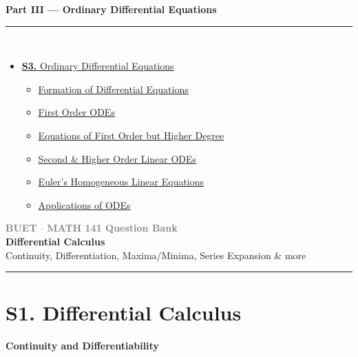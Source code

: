 \documentclass[12pt,a3paper]{article}
\newcommand{\subtopic}[2]{%
  \vspace{10pt}
  \noindent\begin{tcolorbox}[colback=#1!8,colframe=#1,boxrule=0.6pt,arc=4pt,
    left=6pt,right=6pt,top=4pt,bottom=4pt]
    \small\bfseries\textcolor{#1}{#2}
  \end{tcolorbox}
  \vspace{2pt}
}
\newcommand{\secdivider}[3]{%
  \newpage\thispagestyle{empty}%
  \vspace*{\fill}%
  \begin{tcolorbox}[enhanced,colback=#3!6,colframe=#3,boxrule=1.5pt,arc=8pt,
    left=20pt,right=20pt,top=22pt,bottom=22pt,
    shadow={3pt}{-3pt}{0pt}{black!15}]
    \centering
    {\large\textcolor{gray}{\textbf{BUET $\cdot$ MATH 141 Question Bank}}}\\[8pt]
    {\fontsize{26}{32}\selectfont\bfseries\textcolor{#3}{#1}}\\[6pt]
    {\fontsize{15}{19}\selectfont\textcolor{dgray}{#2}}\\[12pt]
    \textcolor{#3!60}{\rule{0.5\textwidth}{0.5pt}}
  \end{tcolorbox}%
  \vspace*{\fill}\newpage%
}
\begin{document}
\begin{tcolorbox}[breakable,colback=cC!5,colframe=cC,boxrule=1pt,arc=5pt,
  left=8pt,right=8pt,top=8pt,bottom=8pt,before skip=4pt]
  {\large\bfseries\textcolor{cC}{Part III --- Ordinary Differential Equations}}\\[5pt]
  \textcolor{cC!40}{\rule{\textwidth}{0.4pt}}\\[3pt]
  \small\begin{itemize}[leftmargin=1.2em,itemsep=1pt,label={\textcolor{cC}{$\triangleright$}}]
    \item \hyperref[sec:S3]{\textbf{S3.} Ordinary Differential Equations}
      \begin{itemize}[leftmargin=1.5em,itemsep=0pt,label={\textcolor{cC}{$\cdot$}}]
        \item \hyperref[sub:s3-formation]{Formation of Differential Equations}
        \item \hyperref[sub:s3-first]{First Order ODEs}
        \item \hyperref[sub:s3-higherdeg]{Equations of First Order but Higher Degree}
        \item \hyperref[sub:s3-linear]{Second \& Higher Order Linear ODEs}
        \item \hyperref[sub:s3-euler]{Euler's Homogeneous Linear Equations}
        \item \hyperref[sub:s3-applications]{Applications of ODEs}
      \end{itemize}
  \end{itemize}
\end{tcolorbox}


\newpage
\secdivider{Differential Calculus}{Continuity, Differentiation, Maxima/Minima, Series Expansion \& more}{cA}

\section{S1. Differential Calculus}
\label{sec:S1}

\subtopic{cA}{Continuity and Differentiability}
\label{sub:s1-cont}
\end{document}
